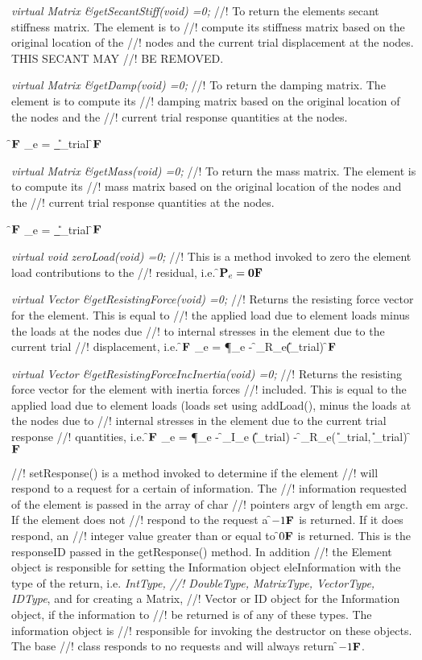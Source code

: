 {\em virtual Matrix \&getSecantStiff(void) =0;}
//! To return the elements secant stiffness matrix. The element is to
//! compute its stiffness matrix based on the original location of the
//! nodes and the current trial displacement at the nodes. THIS SECANT MAY
//! BE REMOVED.

{\em virtual Matrix \&getDamp(void) =0;}
//! To return the damping matrix. The element is to compute its
//! damping matrix based on the original location of the nodes and the
//! current trial response quantities at the nodes. 

\f${\bf F}$ 
\C_e = {
\vert}_{\U_{trial}}
\f${\bf F}$

{\em virtual Matrix \&getMass(void) =0;}
//! To return the mass matrix. The element is to compute its
//! mass matrix based on the original location of the nodes and the
//! current trial response quantities at the nodes. 

\f${\bf F}$ 
\M_e  = {
\vert}_{\U_{trial}}
\f${\bf F}$

{\em virtual void zeroLoad(void) =0;}
//! This is a method invoked to zero the element load contributions to the
//! residual, i.e. \f${\bf P}_e = {\bf 0}{\bf F}$ 

{\em virtual Vector \&getResistingForce(void) =0;}
//! Returns the resisting force vector for the element. This is equal to
//! the applied load due to element loads minus the loads at the nodes due
//! to internal stresses in the element due to the current trial
//! displacement, i.e. 
\f${\bf F}$
\R_e = 
\P_{e} - \f_{R_e}(\U_{trial}) 
\f${\bf F}$

{\em virtual Vector \&getResistingForceIncInertia(void) =0;}
//! Returns the resisting force vector for the element with inertia forces
//! included. This is equal to the applied load due to element loads
(loads set using addLoad(), minus the loads at the nodes due to
//! internal stresses in the element due to the current trial response
//! quantities, i.e.
\f${\bf F}$
\R_e = 
\P_e -  \f_{I_e} (\ddot \U_{trial}) - \f_{R_e}(\dot
\U_{trial}, \U_{trial})
\f${\bf F}$


//! setResponse() is a method invoked to determine if the element
//! will respond to a request for a certain of information. The
//! information requested of the element is passed in the array of char
//! pointers \p argv of length {em argc}. If the element does not
//! respond to the request a \f$-1{\bf F}$ is returned. If it does respond, an
//! integer value greater than or equal to \f$0{\bf F}$ is returned. This is the
\p responseID passed in the getResponse() method. In addition
//! the Element object is responsible for setting the Information object
\p eleInformation with the type of the return, i.e. {\em IntType,
//! DoubleType, MatrixType, VectorType, IDType}, and for creating a Matrix,
//! Vector or ID object for the Information object, if the information to
//! be returned is of any of these types. The information object is
//! responsible for invoking the destructor on these objects. The base
//! class responds to no requests and will always return \f$-1{\bf F}$.

